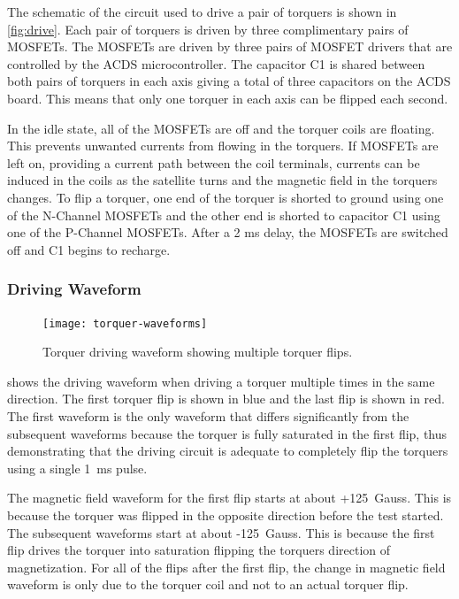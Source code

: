 The schematic of the circuit used to drive a pair of torquers is shown in \cref{fig:drive}. Each pair of torquers is driven by three complimentary pairs of \acp{MOSFET}.  The \acp{MOSFET} are driven by three pairs of \ac{MOSFET} drivers that are controlled by the \ac{ACDS} microcontroller. The capacitor C1 is shared between both pairs of torquers in each axis giving a total of three capacitors on the \ac{ACDS} board. This means that only one torquer in each axis can be flipped each second. 

In the idle state, all of the \acp{MOSFET} are off and the torquer coils are floating. This prevents unwanted currents from flowing in the torquers. If \acp{MOSFET} are left on, providing a current path between the coil terminals, currents can be induced in the coils as the satellite turns and the magnetic field in the torquers changes. To flip a torquer, one end of the torquer is shorted to ground using one of the N-Channel \acp{MOSFET} and the other end is shorted to capacitor C1 using one of the P-Channel \acp{MOSFET}. After a 2 ms delay, the \acp{MOSFET} are switched off and C1 begins to recharge.

\subsubsection{Driving Waveform}

\begin{figure}[htb!]
    \centering
    \texttt{[image: torquer-waveforms]}
    \caption{Torquer driving waveform showing multiple torquer flips.}
    \label{fig:driveWV}
\end{figure}

 shows the driving waveform when driving a torquer multiple times in the same direction. The first torquer flip is shown in blue and the last flip is shown in red. The first waveform is the only waveform that differs significantly from the subsequent waveforms because the torquer is fully saturated in the first flip, thus demonstrating that the driving circuit is adequate to completely flip the torquers using a single 1~ms pulse.

The magnetic field waveform for the first flip starts at about +125~Gauss. This is because the torquer was flipped in the opposite direction before the test started. The subsequent waveforms start at about -125~Gauss. This is because the first flip drives the torquer into saturation flipping the torquers direction of magnetization. For all of the flips after the first flip, the change in magnetic field waveform is only due to the torquer coil and not to an actual torquer flip.

